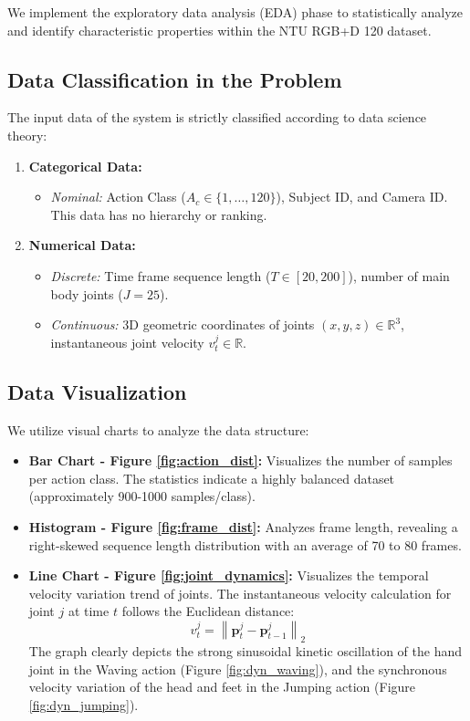\documentclass[conference]{IEEEtran}
\begin{document}
We implement the exploratory data analysis (EDA) phase to statistically analyze and identify characteristic properties within the NTU RGB+D 120 dataset.

\subsection{Data Classification in the Problem}
The input data of the system is strictly classified according to data science theory:
\begin{enumerate}
    \item \textbf{Categorical Data:}
    \begin{itemize}
        \item \textit{Nominal:} Action Class ($A_c \in \{1, \dots, 120\}$), Subject ID, and Camera ID. This data has no hierarchy or ranking.
    \end{itemize}
    \item \textbf{Numerical Data:}
    \begin{itemize}
        \item \textit{Discrete:} Time frame sequence length ($T \in [20, 200]$), number of main body joints ($J = 25$).
        \item \textit{Continuous:} 3D geometric coordinates of joints $(x, y, z) \in \mathbb{R}^3$, instantaneous joint velocity $v_t^j \in \mathbb{R}$.
    \end{itemize}
\end{enumerate}

\subsection{Data Visualization}
We utilize visual charts to analyze the data structure:
\begin{itemize}
    \item \textbf{Bar Chart - Figure \ref{fig:action_dist}:} Visualizes the number of samples per action class. The statistics indicate a highly balanced dataset (approximately 900-1000 samples/class).
    \item \textbf{Histogram - Figure \ref{fig:frame_dist}:} Analyzes frame length, revealing a right-skewed sequence length distribution with an average of 70 to 80 frames.
    \item \textbf{Line Chart - Figure \ref{fig:joint_dynamics}:} Visualizes the temporal velocity variation trend of joints. The instantaneous velocity calculation for joint $j$ at time $t$ follows the Euclidean distance:
    \begin{equation}
    v_t^j = \left\| \mathbf{p}_t^j - \mathbf{p}_{t-1}^j \right\|_2
    \end{equation}
    The graph clearly depicts the strong sinusoidal kinetic oscillation of the hand joint in the Waving action (Figure \ref{fig:dyn_waving}), and the synchronous velocity variation of the head and feet in the Jumping action (Figure \ref{fig:dyn_jumping}).
\end{itemize}
\end{document}
